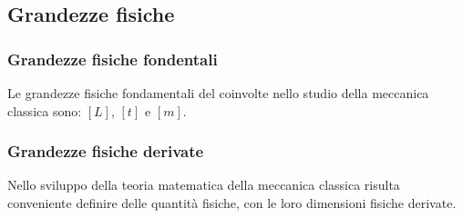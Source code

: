 \documentclass[letterpaper,10pt,italian]{jupyterBook}
\begin{document}
\subsection{Grandezze fisiche}
\label{\detokenize{ch/mechanics/intro-vocabulary:grandezze-fisiche}}\label{\detokenize{ch/mechanics/intro-vocabulary:physics-hs-mechanics-intro-vocabulary-physical-dimensions}}

\subsubsection{Grandezze fisiche fondentali}
\label{\detokenize{ch/mechanics/intro-vocabulary:grandezze-fisiche-fondentali}}\label{\detokenize{ch/mechanics/intro-vocabulary:physics-hs-mechanics-intro-vocabulary-physical-dimensions-fundamental}}
\sphinxAtStartPar
Le grandezze fisiche fondamentali del  coinvolte nello studio della meccanica classica sono:  \([L]\),  \([t]\) e  \([m]\).


\subsubsection{Grandezze fisiche derivate}
\label{\detokenize{ch/mechanics/intro-vocabulary:grandezze-fisiche-derivate}}\label{\detokenize{ch/mechanics/intro-vocabulary:physics-hs-mechanics-intro-vocabulary-physical-dimensions-derived}}
\sphinxAtStartPar
Nello sviluppo della teoria matematica della meccanica classica risulta conveniente definire delle quantità fisiche, con le loro dimensioni fisiche derivate.
\end{document}
